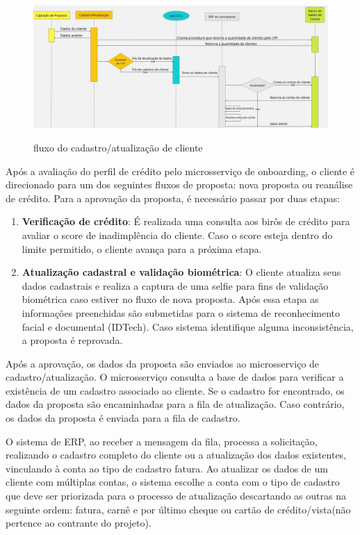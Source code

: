\begin{figure} [!h]
    \centering
    \caption{fluxo do cadastro/atualização de cliente}
    \includegraphics[width=1\textwidth]{arquivos/imagens/Cadastro-Atualizacao-fluxo.jpg}
    \label{fluxo-Cadastro-Atualizacao}
\end{figure}

Após a avaliação do perfil de crédito pelo microsserviço de onboarding, 
o cliente é direcionado para um dos seguintes fluxos de proposta: 
nova proposta ou reanálise de crédito. 
Para a aprovação da proposta, é necessário passar por duas etapas:
\begin{enumerate}
    \item \textbf{Verificação de crédito}: É realizada uma consulta aos birôs de 
    crédito para avaliar o score de inadimplência do cliente. 
    Caso o score esteja dentro do limite permitido, o cliente avança 
    para a próxima etapa.
    \item \textbf{Atualização cadastral e validação biométrica}: O cliente 
    atualiza seus dados cadastrais e realiza a captura de uma selfie para fins 
    de validação biométrica caso estiver no fluxo de nova proposta.
    Após essa etapa as informações preenchidas são 
    submetidas para o sistema de reconhecimento facial e documental (IDTech). 
    Caso sistema identifique alguma inconsistência, a proposta é reprovada.
\end{enumerate}

Após a aprovação, os dados da proposta são enviados ao microsserviço de 
cadastro/atualização. O microsserviço consulta a base de dados para verificar a 
existência de um cadastro associado ao cliente. Se o cadastro for encontrado, 
os dados da proposta são encaminhadas para a fila de atualização. 
Caso contrário, os dados da proposta é enviada para a fila de cadastro.

O sistema de ERP, ao receber a mensagem da fila, 
processa a solicitação, realizando o cadastro completo do
cliente ou a atualização dos dados existentes, vinculando à conta ao tipo de 
cadastro fatura. Ao atualizar os dados de um cliente com múltiplas contas, 
o sistema escolhe a conta com o tipo de cadastro que deve ser priorizada para 
o processo de atualização descartando as outras na seguinte ordem: 
fatura, carnê e por último cheque ou cartão de crédito/vista(não pertence ao contrante do projeto).

